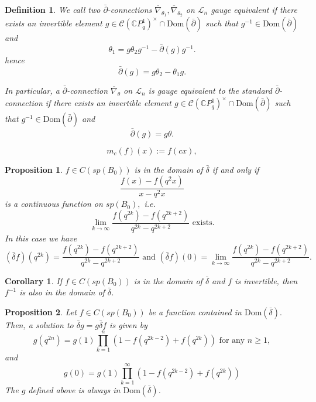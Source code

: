 \documentclass[10pt,a4paper]{amsart}
\newtheorem{definition}{Definition}
\newtheorem{proposition}{Proposition}
\newtheorem{corollary}{Corollary}
\def\C{{\mathbb C}}
\def\Dom{{\mathrm {Dom}}}
\def\L{\mathcal{L}}
\def\d{\bar{\delta}}
\def\db{\bar{\delta}}
\def\pb{\bar{\partial}}
\begin{document}
\begin{definition}\label{def: gauge equivalence}
     We call two $\pb$-connections $\overline{\nabla}_{\theta_1}, \overline{\nabla}_{\theta_2}$ on  $\L_n$   gauge equivalent if there exists an invertible element $g\in \mathcal{C}(\C P^1_q)^{\times}\cap \Dom(\pb)$ such that $g^{-1}\in \Dom(\pb)$ and
     $$
         \theta_1=g\theta_2 g^{-1}-\pb(g)g^{-1}.
    $$
     hence
      \begin{equation}\label{eq: gauge equivalence general}
        \pb(g)= g\theta_2 -\theta_1 g.
     \end{equation}

     In particular, a $\pb$-connection $\overline{\nabla}_{\theta}$ on  $\L_n$ is gauge equivalent to the standard $\pb$-connection if there exists an invertible element $g\in \mathcal{C}(\C P^1_q)^{\times}\cap \Dom(\pb)$ such that $g^{-1}\in \Dom(\pb)$ and
     \begin{equation}\label{eq: gauge equivalence to standard general}
        \pb(g)=g\theta.
     \end{equation}
\end{definition}

\begin{equation}\label{eq: mc}
    m_c(f)(x):=f(cx),
\end{equation}

\begin{proposition} \label{prop: delta_bar_domain}
    $f\in C(sp(B_0))$ is in the domain of $\d$ if and only if \[
    \frac{f(x)-f(q^2 x)}{x-q^2 x}
    \]
    is a continuous function on $sp(B_0),$ i.e.
    $$
    \lim_{k\to \infty}\frac{f(q^{2k})-f(q^{2k+2})}{q^{2k}-q^{2k+2}} \text{ exists.}
    $$
In this case we have  \begin{equation}
    (\db f)(q^{2k})=\frac{f(q^{2k})-f(q^{2k+2})}{q^{2k}-q^{2k+2}} \text{ and }(\db f)(0)= \lim_{k\to \infty}\frac{f(q^{2k})-f(q^{2k+2})}{q^{2k}-q^{2k+2}}.
\end{equation}
\end{proposition}

\begin{corollary}\label{coro: inverse domain d}
    If  $f\in C(sp(B_0))$ is in the domain of $\d$ and $f$ is invertible, then $f^{-1}$ is also in the domain of $\d$.
\end{corollary}

\begin{proposition} \label{prop: solution g in product form}
    Let $f\in C(sp(B_0))$ be a function contained in $\Dom(\db).$ Then, a solution to $\d g = g \d f$ is given by \begin{equation}\label{eq: def of g}
    g(q^{2n}) = g(1) \prod_{k = 1}^n  (1 - f(q^{2k - 2}) + f(q^{2k})) \text{ for any }n\geq 1,
    \end{equation}
    and \begin{equation}\label{eq: def of g0}
    g(0) = g(1)\prod_{k = 1}^\infty (1 - f(q^{2k - 2}) + f(q^{2k}))
    \end{equation}
   The $g$ defined above is always in $\Dom(\db)$.
\end{proposition}
\end{document}
